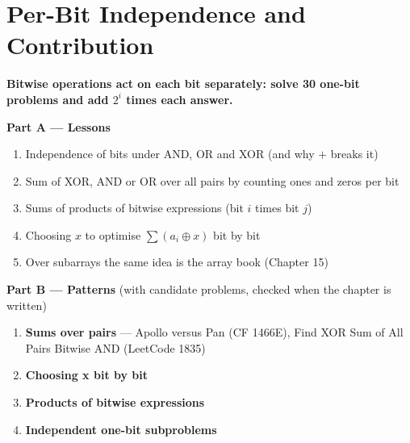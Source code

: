 \chapter{Per-Bit Independence and Contribution}
\label{ch:per_bit}

\begin{tcolorbox}[enhanced, colback=white, colframe=secondaryblue, boxrule=1pt, arc=2mm]
\textbf{\large\textcolor{primaryblue}{Bitwise operations act on each bit separately: solve 30 one-bit problems and add $2^i$ times each answer.}}
\end{tcolorbox}


\begin{plannedbox}
\textbf{Part A --- Lessons}
\begin{enumerate}[leftmargin=*, label=\textbf{A\arabic*.}, itemsep=1pt]
    \item Independence of bits under AND, OR and XOR (and why $+$ breaks it)
    \item Sum of XOR, AND or OR over all pairs by counting ones and zeros per bit
    \item Sums of products of bitwise expressions (bit $i$ times bit $j$)
    \item Choosing $x$ to optimise $\sum (a_i \oplus x)$ bit by bit
    \item Over subarrays the same idea is the array book (Chapter 15)
\end{enumerate}
\textbf{Part B --- Patterns} (with candidate problems, checked when the chapter is written)
\begin{enumerate}[leftmargin=*, label=\textbf{P\arabic*.}, itemsep=1pt]
    \item \textbf{Sums over pairs} --- Apollo versus Pan {\small\color{darkgray}(CF 1466E)}, Find XOR Sum of All Pairs Bitwise AND {\small\color{darkgray}(LeetCode 1835)}
    \item \textbf{Choosing x bit by bit}
    \item \textbf{Products of bitwise expressions}
    \item \textbf{Independent one-bit subproblems}
\end{enumerate}
\end{plannedbox}
